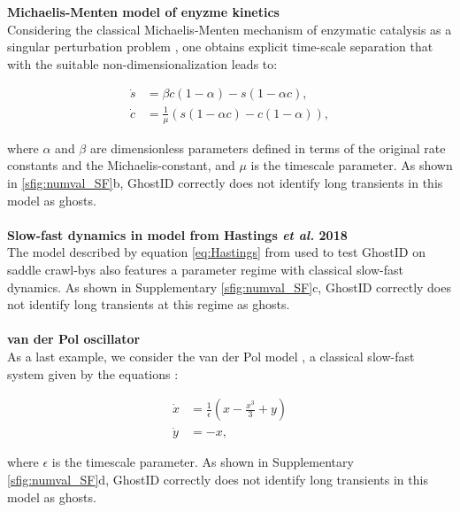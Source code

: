 \documentclass{article}
\theoremstyle{definition}
\begin{document}
\begin{refsection}
\textbf{Michaelis-Menten model of enyzme kinetics}\\
Considering the classical Michaelis-Menten mechanism of enzymatic catalysis as a singular perturbation problem \cite{Heineken1967}, one obtains explicit time-scale separation that with the suitable non-dimensionalization \cite{roussel2005singular} leads to:

\begin{align*}
\dot s &= \beta c (1 - \alpha) - s (1 - \alpha c), \\
\dot c &= \frac{1}{\mu}(s (1 - \alpha c) - c (1 - \alpha)),
\end{align*}

where $\alpha$ and $\beta$ are dimensionless parameters defined in terms of the original rate constants and the Michaelis-constant, and $\mu$ is the timescale parameter. As shown in \autoref{sfig:numval_SF}b, GhostID correctly does not identify long transients in this model as ghosts.
\\ \\
\textbf{Slow-fast dynamics in model from Hastings \textit{et al.} 2018}\\
The model described by equation \ref{eq:Hastings} from \cite{Hastings_2018} used to test GhostID on saddle crawl-bys also features a parameter regime with classical slow-fast dynamics. As shown in Supplementary \autoref{sfig:numval_SF}c, GhostID correctly does not identify long transients at this regime as ghosts.
\\ \\
\textbf{van der Pol oscillator}\\
As a last example, we consider the van der Pol model \cite{van_der_Pol_1928}, a classical slow-fast system given by the equations \cite{Kuehn_2015}:

\begin{align}\label{eq:Vdp}
    \nonumber \dot{x} &= \frac{1}{\epsilon}(x-\frac{x^3}{3}+y)  \\ 
    \dot{y} &= -x,
\end{align}

\noindent where $\epsilon$ is the timescale parameter.  As shown in Supplementary \autoref{sfig:numval_SF}d, GhostID correctly does not identify long transients in this model as ghosts.




\end{refsection}
\end{document}
